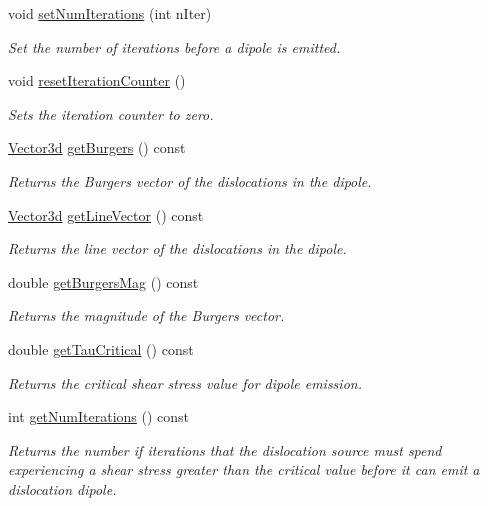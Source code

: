 \begin{DoxyCompactItemize}
void \hyperlink{classDislocationSource_a3042d73ee7ee346d825ab810dc5a6e83}{set\-Num\-Iterations} (int n\-Iter)
\begin{DoxyCompactList}\small\item\em \-Set the number of iterations before a dipole is emitted. \end{DoxyCompactList}\item 
void \hyperlink{classDislocationSource_a6dd6ad9fe448ce37152dfae4f3981ff0}{reset\-Iteration\-Counter} ()
\begin{DoxyCompactList}\small\item\em \-Sets the iteration counter to zero. \end{DoxyCompactList}\item 
\hyperlink{classVector3d}{\-Vector3d} \hyperlink{classDislocationSource_a47e3d707ffdecb9ecd7dd6dff47930c2}{get\-Burgers} () const 
\begin{DoxyCompactList}\small\item\em \-Returns the \-Burgers vector of the dislocations in the dipole. \end{DoxyCompactList}\item 
\hyperlink{classVector3d}{\-Vector3d} \hyperlink{classDislocationSource_ad47bab97726e7ec0591932d3f9f50271}{get\-Line\-Vector} () const 
\begin{DoxyCompactList}\small\item\em \-Returns the line vector of the dislocations in the dipole. \end{DoxyCompactList}\item 
double \hyperlink{classDislocationSource_ab272383ee903fa84f4f36104d13dfcb8}{get\-Burgers\-Mag} () const 
\begin{DoxyCompactList}\small\item\em \-Returns the magnitude of the \-Burgers vector. \end{DoxyCompactList}\item 
double \hyperlink{classDislocationSource_a570b0ddb54028fd59c6cdcc460b32a9b}{get\-Tau\-Critical} () const 
\begin{DoxyCompactList}\small\item\em \-Returns the critical shear stress value for dipole emission. \end{DoxyCompactList}\item 
int \hyperlink{classDislocationSource_a2e5651d778ff7d02f5db1529066542cc}{get\-Num\-Iterations} () const 
\begin{DoxyCompactList}\small\item\em \-Returns the number if iterations that the dislocation source must spend experiencing a shear stress greater than the critical value before it can emit a dislocation dipole. \end{DoxyCompactList}\item 

\end{DoxyCompactItemize}
